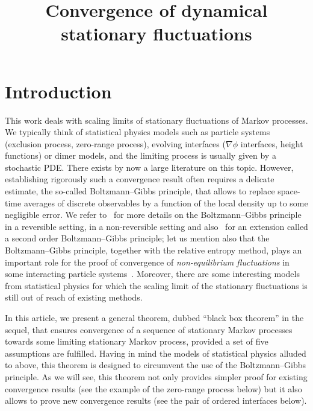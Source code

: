 \documentclass[AHL,Unicode,longabstracts]{cedram}
\title{Convergence of dynamical stationary fluctuations}
\author[\initial{C.} \lastname{Labbé}]{\firstname{Cyril} \lastname{Labbé}}
\author[\initial{B.} \lastname{Laslier}]{\firstname{Beno\^it} \lastname{Laslier}}
\author[\initial{F.} \lastname{Toninelli}]{\firstname{Fabio} \lastname{Toninelli}}
\author[\initial{L.} \lastname{Zambotti}]{\firstname{Lorenzo} \lastname{Zambotti}}
\theoremstyle{plain}
\begin{document}
\maketitle



\setcounter{tocdepth}{1}
\tableofcontents

\section{Introduction}

This work deals with scaling limits of stationary fluctuations of Markov processes. We typically think of statistical physics models such as particle systems (exclusion process, zero-range process), evolving interfaces ($\nabla \phi$ interfaces, height functions) or dimer models, and the limiting process is usually given by a stochastic PDE. There exists by now a large literature on this topic. However, establishing rigorously such a convergence result often requires a delicate estimate, the so-called Boltzmann--Gibbs principle, that allows to replace space-time averages of discrete observables by a function of the local density up to some negligible error. We refer to~\cite[Section~11.1]{KipLan} for more details on the Boltzmann--Gibbs principle in a reversible setting, \cite{ChangLandimOlla} in a non-reversible setting and also~\cite{GoncalvesJara} for an extension called a second order Boltzmann--Gibbs principle; let us mention also that the Boltzmann--Gibbs principle, together with the relative entropy method, plays an important role for the proof of convergence of \emph{non-equilibrium fluctuations} in some interacting particle systems~\cite{JM}. Moreover, there are some interesting models from statistical physics for which the scaling limit of the stationary fluctuations is still out of reach of existing methods.

In this article, we present a general theorem, dubbed ``black box theorem'' in the sequel, that ensures convergence of a sequence of stationary Markov processes towards some limiting stationary Markov process, provided a set of five assumptions are fulfilled. Having in mind the models of statistical physics alluded to above, this theorem is designed to circumvent the use of the Boltzmann--Gibbs principle. As we will see, this theorem not only provides simpler proof for existing convergence results (see the example of the zero-range process below) but it also allows to prove new convergence results (see the pair of ordered interfaces below).
\end{document}
